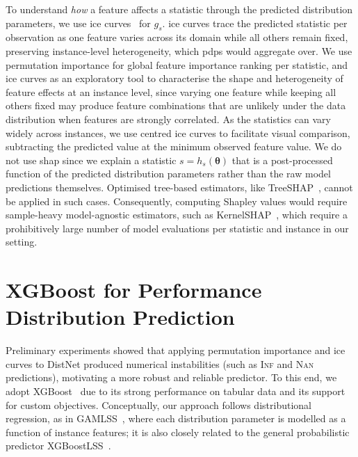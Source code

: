 To understand \emph{how} a feature affects a statistic through the predicted distribution parameters, we use \gls{ice} curves~\citep{GolEtAl15} for $g_s$.
\gls{ice} curves trace the predicted statistic per observation as one feature varies across its domain while all others remain fixed, preserving instance-level heterogeneity, which \glspl{pdp} would aggregate over.
We use permutation importance for global feature importance ranking per statistic, and \gls{ice} curves as an exploratory tool to characterise the shape and heterogeneity of feature effects at an instance level, since varying one feature while keeping all others fixed may produce feature combinations that are unlikely under the data distribution when features are strongly correlated.
As the statistics can vary widely across instances, we use centred \gls{ice} curves to facilitate visual comparison, subtracting the predicted value at the minimum observed feature value.
We do not use \gls{shap} since we explain a statistic $s = h_s(\boldsymbol\theta)$ that is a post-processed function of the predicted distribution parameters rather than the raw model predictions themselves. Optimised tree-based estimators, like TreeSHAP~\citep{LunEtAl20}, cannot be applied in such cases. Consequently, computing Shapley values would require sample-heavy model-agnostic estimators, such as KernelSHAP~\citep{StrKon14}, which require a prohibitively large number of model evaluations per statistic and instance in our setting.

\section{XGBoost for Performance Distribution Prediction}
\label{sec:ch09:xgboost}

Preliminary experiments showed that applying permutation importance and \gls{ice} curves to DistNet produced numerical instabilities (such as \textsc{Inf} and \textsc{Nan} predictions), motivating a more robust and reliable predictor.
To this end, we adopt XGBoost~\citep{CheGue16} due to its strong performance on tabular data and its support for custom objectives.
Conceptually, our approach follows distributional regression, as in GAMLSS~\citep{RigSta05}, where each distribution parameter is modelled as a function of instance features; it is also closely related to the general probabilistic predictor XGBoostLSS~\citep{Marz19}.

